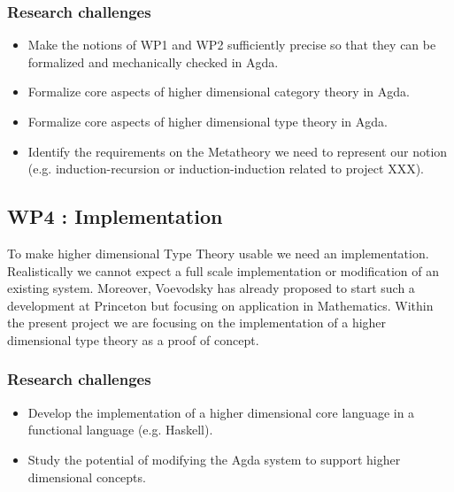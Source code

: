 \documentclass[a4paper]{article}
\begin{document}
\subsubsection*{Research challenges}

\begin{itemize}
\item Make the notions of WP1 and WP2 sufficiently precise so that they
  can be formalized and mechanically checked in Agda.

\item Formalize core aspects of higher dimensional category theory in
  Agda.

\item Formalize core aspects of higher dimensional type theory in Agda.

\item Identify the requirements on the Metatheory we need to represent
  our notion (e.g. induction-recursion or induction-induction related
  to project XXX).

\end{itemize}

\subsection*{WP4 : Implementation} 

To make higher dimensional Type Theory usable we need an
implementation. Realistically we cannot expect a full scale
implementation or modification of an existing system. Moreover,
Voevodsky has already proposed to start such a development at
Princeton but focusing on application in Mathematics. Within the
present project we are focusing on the implementation of a higher
dimensional type theory as a proof of concept. 

\subsubsection*{Research challenges}

\begin{itemize}
\item Develop the implementation of a higher dimensional core language
  in a functional language (e.g. Haskell).

\item Study the potential of modifying the Agda system to support
  higher dimensional concepts.
  
\end{itemize}
\end{document}
